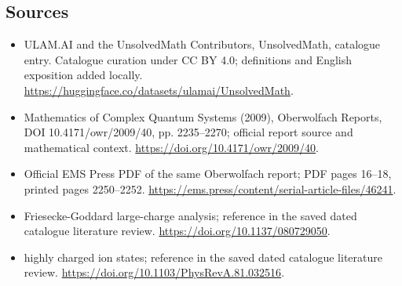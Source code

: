\documentclass[11pt]{article}
\begin{document}
\subsection{Sources}
\begin{itemize}
\item[\hypertarget{source:statement:1}{S1}] ULAM.AI and the UnsolvedMath Contributors, UnsolvedMath, catalogue entry. Catalogue curation under CC BY 4.0; definitions and English exposition added locally.
\url{https://huggingface.co/datasets/ulamai/UnsolvedMath}.
\item[\hypertarget{source:statement:2}{S2}] Mathematics of Complex Quantum Systems (2009), Oberwolfach Reports, DOI 10.4171/owr/2009/40, pp. 2235--2270; official report source and mathematical context.
\url{https://doi.org/10.4171/owr/2009/40}.
\item[\hypertarget{source:statement:3}{S3}] Official EMS Press PDF of the same Oberwolfach report; PDF pages 16--18, printed pages 2250--2252.
\url{https://ems.press/content/serial-article-files/46241}.
\item[\hypertarget{source:statement:4}{S4}] Friesecke-Goddard large-charge analysis; reference in the saved dated catalogue literature review.
\url{https://doi.org/10.1137/080729050}.
\item[\hypertarget{source:statement:5}{S5}] highly charged ion states; reference in the saved dated catalogue literature review.
\url{https://doi.org/10.1103/PhysRevA.81.032516}.
\end{itemize}
\label{end:statement}
\end{document}
